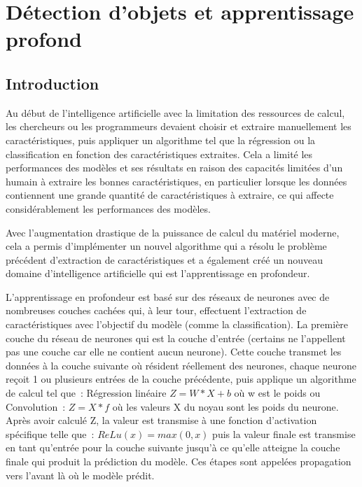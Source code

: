 %
%

\chapter{Détection d'objets et apprentissage profond}
\newpage
\pagestyle{fancy}
\fancyhead[L]{\chaptername \ \thechapter}
\renewcommand{\headrulewidth}{1pt}
\fancyfoot[C]{\thepage}
\section{Introduction} 
Au début de l'intelligence artificielle avec la limitation des ressources de calcul, les chercheurs ou les programmeurs devaient choisir et extraire manuellement les caractéristiques, puis appliquer un algorithme tel que la régression ou la classification en fonction des caractéristiques extraites. Cela a limité les performances des modèles et ses résultats en raison des capacités limitées d'un humain à extraire les bonnes caractéristiques, en particulier lorsque les données contiennent une grande quantité de caractéristiques à extraire, ce qui affecte considérablement les performances des modèles.

Avec l'augmentation drastique de la puissance de calcul du matériel moderne, cela a permis d'implémenter un nouvel algorithme qui a résolu le problème précédent d'extraction de caractéristiques et a également créé un nouveau domaine d'intelligence artificielle qui est l'apprentissage en profondeur.

L'apprentissage en profondeur est basé sur des réseaux de neurones avec de nombreuses couches cachées qui, à leur tour, effectuent l'extraction de caractéristiques avec l'objectif du modèle (comme la classification). La première couche du réseau de neurones qui est la couche d'entrée (certains ne l'appellent pas une couche car elle ne contient aucun neurone). Cette couche transmet les données à la couche suivante où résident réellement des neurones, chaque neurone reçoit 1 ou plusieurs entrées de la couche précédente, puis applique un algorithme de calcul tel que : Régression linéaire \(Z = W * X + b\) où w est le poids ou Convolution : \(Z = X * f\) où les valeurs X du noyau sont les poids du neurone. Après avoir calculé Z, la valeur est transmise à une fonction d'activation spécifique telle que : \(ReLu(x) = max(0,x)\) puis la valeur finale est transmise en tant qu'entrée pour la couche suivante jusqu'à ce qu'elle atteigne la couche finale qui produit la prédiction du modèle. Ces étapes sont appelées propagation vers l'avant là où le modèle prédit. 


